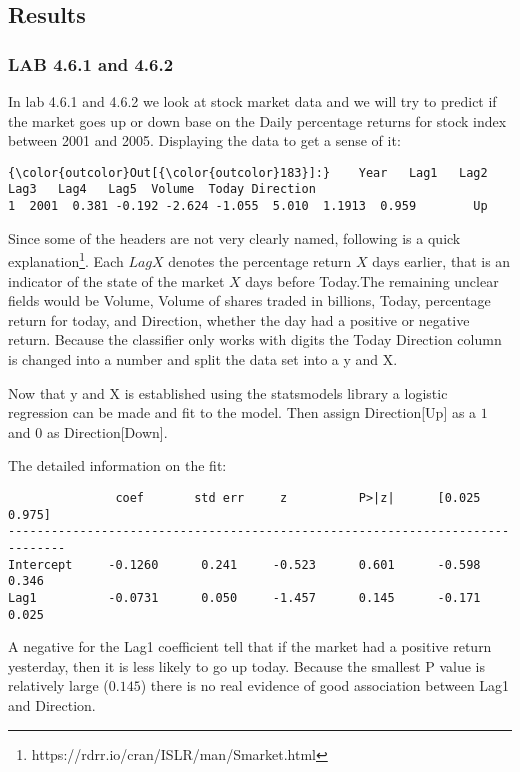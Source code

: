 
\subsection{Results}
\subsubsection*{LAB 4.6.1 and 4.6.2}
In lab 4.6.1 and 4.6.2 we look at stock market data and we will try to predict if the market goes up or down base on the Daily percentage returns for stock index between 2001 and 2005.
Displaying the data to get a sense of it:
\begin{Verbatim}[commandchars=\\\{\}]
{\color{outcolor}Out[{\color{outcolor}183}]:}    Year   Lag1   Lag2   Lag3   Lag4   Lag5  Volume  Today Direction
1  2001  0.381 -0.192 -2.624 -1.055  5.010  1.1913  0.959        Up
\end{Verbatim}
Since some of the headers are not very clearly named, following is a quick explanation\footnote{https://rdrr.io/cran/ISLR/man/Smarket.html}. Each $LagX$ denotes the percentage return $X$ days earlier, that is an indicator of the state of the market $X$ days before Today.The remaining unclear fields would be Volume, Volume of shares traded in billions, Today, percentage return for today, and Direction, whether the day had a positive or negative return. Because the classifier only works with digits the Today Direction column is changed into a number and split the data set into a y and X.

Now that y and X is established using the statsmodels library a logistic regression can be made and fit to the model. Then assign Direction[Up] as a $1$ and $0$ as Direction[Down].

The detailed information on the fit:
\begin{lstlisting}
               coef       std err     z          P>|z|      [0.025      0.975]
------------------------------------------------------------------------------
Intercept     -0.1260      0.241     -0.523      0.601      -0.598       0.346
Lag1          -0.0731      0.050     -1.457      0.145      -0.171       0.025
\end{lstlisting}
A negative for the Lag1 coefficient tell that if the market had a positive return yesterday, then it is less likely to go up today. Because the smallest P value is relatively large ($0.145$) there is no real evidence of good association between Lag1 and Direction.

